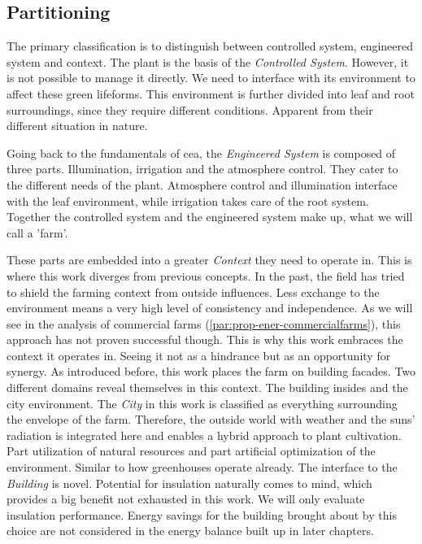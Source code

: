 \subsection{Partitioning}
\label{sub:partitioning}
The primary classification is to distinguish between controlled system, engineered system and context.
The plant is the basis of the \textit{Controlled System}.
However, it is not possible to manage it directly.
We need to interface with its environment to affect these green lifeforms.
This environment is further divided into leaf and root surroundings, since they require different conditions.
Apparent from their different situation in nature.

Going back to the fundamentals of \ac{cea}, the \textit{Engineered System} is composed of three parts.
Illumination, irrigation and the atmosphere control.
They cater to the different needs of the plant.
Atmosphere control and illumination interface with the leaf environment, while irrigation takes care of the root system.
Together the controlled system and the engineered system make up, what we will call a 'farm'.

These parts are embedded into a greater \textit{Context} they need to operate in.
This is where this work diverges from previous concepts.
In the past, the field has tried to shield the farming context from outside influences.
Less exchange to the environment means a very high level of consistency and independence.
As we will see in the analysis of commercial farms (\ref{par:prop-ener-commercialfarms}), this approach has not proven successful though.
This is why this work embraces the context it operates in.
Seeing it not as a hindrance but as an opportunity for synergy.
As introduced before, this work places the farm on building facades. %
Two different domains reveal themselves in this context.
The building insides and the city environment.
The \textit{City} in this work is classified as everything surrounding the envelope of the farm.
Therefore, the outside world with weather and the suns' radiation is integrated here and enables a hybrid approach to plant cultivation.
Part utilization of natural resources and part artificial optimization of the environment.
Similar to how greenhouses operate already. 
The interface to the \textit{Building} is novel. %
Potential for insulation naturally comes to mind, which provides a big benefit not exhausted in this work.
We will only evaluate insulation performance.
Energy savings for the building brought about by this choice are not considered in the energy balance built up in later chapters.

